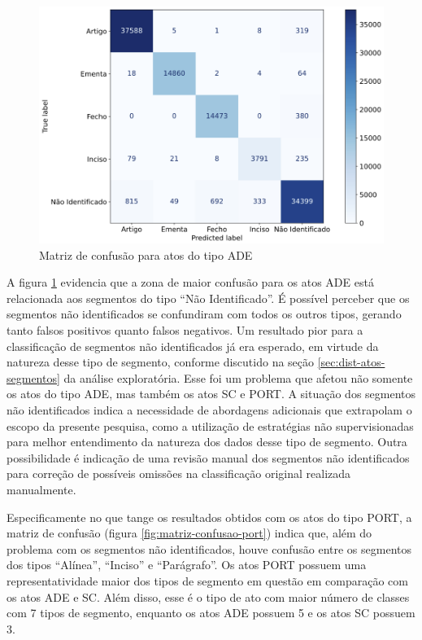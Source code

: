 \begin{figure}[h]
	\caption{Matriz de confusão para atos do tipo ADE}
	\center
	\label{fig:matriz-confusao-ade}
	\includegraphics[scale=0.45]{resultados/matriz-confusao-ade.png}
	\fdp
\end{figure}

A figura \ref{fig:matriz-confusao-ade} evidencia que a zona de maior confusão para os atos ADE está relacionada aos segmentos do tipo ``Não Identificado''. É possível perceber que os segmentos não identificados se confundiram com todos os outros tipos, gerando tanto falsos positivos quanto falsos negativos. Um resultado pior para a classificação de segmentos não identificados já era esperado, em virtude da natureza desse tipo de segmento, conforme discutido na seção \ref{sec:dist-atos-segmentos} da análise exploratória. Esse foi um problema que afetou não somente os atos do tipo ADE, mas também os atos SC e PORT. A situação dos segmentos não identificados indica a necessidade de abordagens adicionais que extrapolam o escopo da presente pesquisa, como a utilização de estratégias não supervisionadas para melhor entendimento da natureza dos dados desse tipo de segmento. Outra possibilidade é indicação de uma revisão manual dos segmentos não identificados para correção de possíveis omissões na classificação original realizada manualmente.

Especificamente no que tange os resultados obtidos com os atos do tipo PORT, a matriz de confusão (figura \ref{fig:matriz-confusao-port}) indica que, além do problema com os segmentos não identificados, houve confusão entre os segmentos dos tipos ``Alínea'', ``Inciso'' e ``Parágrafo''. Os atos PORT possuem uma representatividade maior dos tipos de segmento em questão em comparação com os atos ADE e SC. Além disso, esse é o tipo de ato com maior número de classes com 7 tipos de segmento, enquanto os atos ADE possuem 5 e os atos SC possuem 3.


